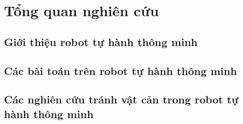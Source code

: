 \chapter{Tổng quan nghiên cứu}

\section{Giới thiệu robot tự hành thông minh}


\section{Các bài toán trên robot tự hành thông minh}


\section{Các nghiên cứu tránh vật cản trong robot tự hành thông minh}
\label{sec:tranhVatCan_ref}


